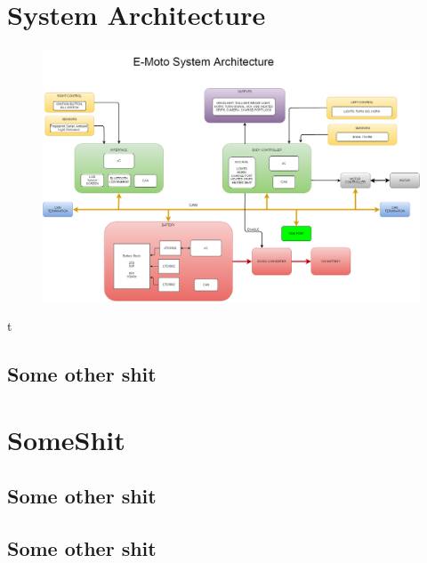 \documentclass[12pt compsoc]{article}
\begin{document}

\section{System Architecture}
\begin{figure}[H]
\centering
\includegraphics[width=7.5in]{E-MotoSystemArch}
\end{figure}t
\subsection{Some other shit}


\section{SomeShit}
\subsection{Some other shit}
\subsection{Some other shit}

\end{document}
